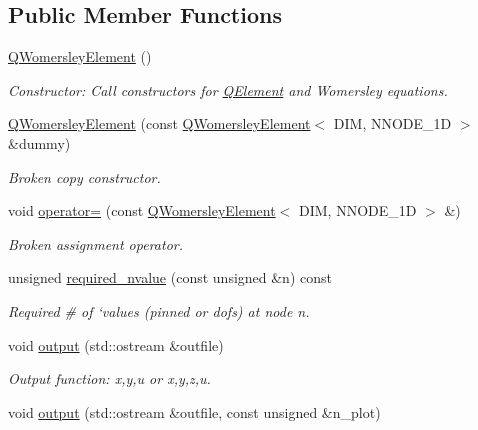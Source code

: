 \subsection*{Public Member Functions}
\begin{DoxyCompactItemize}
\item 
\hyperlink{classoomph_1_1QWomersleyElement_a42dc522e6a7adb0b87e335a797d07bf4}{Q\+Womersley\+Element} ()
\begin{DoxyCompactList}\small\item\em Constructor\+: Call constructors for \hyperlink{classoomph_1_1QElement}{Q\+Element} and Womersley equations. \end{DoxyCompactList}\item 
\hyperlink{classoomph_1_1QWomersleyElement_a4dee9f42d861ede7e487652ed6cc0927}{Q\+Womersley\+Element} (const \hyperlink{classoomph_1_1QWomersleyElement}{Q\+Womersley\+Element}$<$ D\+IM, N\+N\+O\+D\+E\+\_\+1D $>$ \&dummy)
\begin{DoxyCompactList}\small\item\em Broken copy constructor. \end{DoxyCompactList}\item 
void \hyperlink{classoomph_1_1QWomersleyElement_af95b3c5a12638d2bfcc97435a987f8cf}{operator=} (const \hyperlink{classoomph_1_1QWomersleyElement}{Q\+Womersley\+Element}$<$ D\+IM, N\+N\+O\+D\+E\+\_\+1D $>$ \&)
\begin{DoxyCompactList}\small\item\em Broken assignment operator. \end{DoxyCompactList}\item 
unsigned \hyperlink{classoomph_1_1QWomersleyElement_a31a20c3d89a4bc5698c81e01ca22dc8d}{required\+\_\+nvalue} (const unsigned \&n) const
\begin{DoxyCompactList}\small\item\em Required \# of `values\textquotesingle{} (pinned or dofs) at node n. \end{DoxyCompactList}\item 
void \hyperlink{classoomph_1_1QWomersleyElement_a5a8951b6a947e120821c1a83048975d4}{output} (std\+::ostream \&outfile)
\begin{DoxyCompactList}\small\item\em Output function\+: x,y,u or x,y,z,u. \end{DoxyCompactList}\item 
void \hyperlink{classoomph_1_1QWomersleyElement_a98968ff614577c7796f293cb020831da}{output} (std\+::ostream \&outfile, const unsigned \&n\+\_\+plot)

\end{DoxyCompactItemize}
